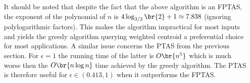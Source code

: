It should be noted that despite the fact that the above algorithm is an FPTAS, the exponent of the polynomial of $n$ is $4\log_{3/2}\br{2}+1\approx 7.838$ (ignoring polylogarithmic factors). This makes the algorithm impractical for most inputs and yields the greedy algorithm querying weighted centroid a preferential choice for most applications. A similar issue concerns the PTAS from the previous section. For $\epsilon=1$ the running time of the latter is $O\br{n^{5}}$ which is much worse then the $O\br{n\log n}$ time achieved by the greedy algorithm. The PTAS is therefore useful for $\epsilon \in (0.413, 1)$ when it outperforms the FPTAS. 

